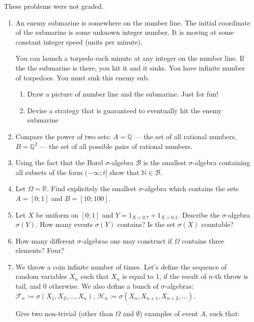 \documentclass[12pt, a4paper]{article}
\begin{document}
These problems were not graded.

\begin{enumerate}
\item  An enemy submarine is somewhere on the number line. The initial coordinate of the submarine is some unknown integer number. It is moving at some constant integer speed (units per minute).

You can launch a torpedo each minute at any integer on the number line. If the the submarine is there, you hit it and it sinks. You have infinite number of torpedoes. You must sink this enemy sub.
\begin{enumerate}
\item Draw a picture of number line and the submarine. Just for fun!
\item Devise a strategy that is guaranteed to eventually hit the enemy submarine
\end{enumerate}

\item Compare the power of two sets: $A=\mathbb{Q}$ — the set of all rational numbers, $B=\mathbb{Q}^2$ — the set of all possible pairs of rational numbers.

\item Using the fact that the Borel $\sigma$-algebra $\mathcal{B}$ is the smallest $\sigma$-algebra containing all subsets of the form $(-\infty; t]$ show that $\mathbb{N}\in \mathcal{B}$.

\item Let $\Omega=\mathbb{R}$. Find explicitely the smallest $\sigma$-algebra which contains the sets $A=[0;1]$ and $B=[10;100]$.

\item Let $X$ be uniform on $[0;1]$ and $Y=1_{X<0.7}+1_{X>0.1}$. Describe the $\sigma$-algebra $\sigma(Y)$. How many events  $\sigma(Y)$ contains? Is the set $\sigma(X)$ countable?

\item How many different $\sigma$-algebras one may construct if $\Omega$ contains three elements? Four?

\item We throw a coin infinite number of times. Let's define the sequence of random variables $X_n$ such that  $X_{n}$ is equal to 1, if the result of $n$-th throw is tail, and 0 otherwise. We also define a bunch of $ \sigma $-algebras: $\mathcal{F}_{n}:=\sigma(X_{1},X_{2},...,X_{n})$, $\mathcal{H}_{n}:=\sigma(X_{n},X_{n+1},X_{n+2},\ldots)$.

Give two non-trivial (other  than $ \Omega $ and $ \emptyset $) examples of event $ A $, such that:


\end{enumerate}
\end{document}
